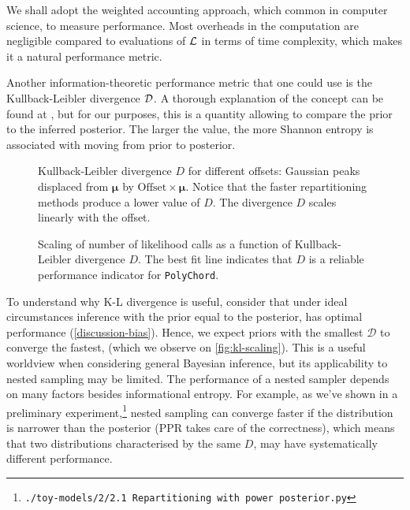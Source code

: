 \documentclass[usenatbib]{mnras}
\begin{document}
We shall adopt the weighted accounting approach, which common in
computer science, to measure performance. Most overheads in the
computation are negligible compared to evaluations of \({\cal L}\) in
terms of time complexity, which makes it a natural performance metric.



Another information-theoretic performance metric that one could use
is the Kullback-Leibler divergence \({\cal D}\). A thorough
explanation of the concept can be found at \cite{Kullback_1951}, but
for our purposes, this is a quantity allowing to compare the prior
to the inferred posterior. The larger the value, the more Shannon
entropy is associated with moving from prior to posterior. 

\begin{figure}
  
\caption{Kullback-Leibler divergence \(D\) for different offsets: Gaussian peaks displaced from \(\bm{\mu}\) by \(\text{Offset}\times \bm{\mu}\). Notice that the faster repartitioning methods produce a lower value of \(D\). The divergence \(D\) scales linearly with the offset. \label{fig:kl-d}}
\end{figure}

\begin{figure}
  
\caption{Scaling of number of likelihood calls as a function of Kullback-Leibler divergence \(D\). The best fit line indicates that \(D\) is a reliable performance indicator for \texttt{PolyChord}. \label{fig:kl-scaling}}
\end{figure}

To understand why K-L divergence is useful, consider that under
ideal circumstances inference with the prior equal to the
posterior, has optimal performance
(\autoref{discussion-bias}). Hence, we expect priors with the
smallest \(\mathcal{D}\) to converge the fastest, (which we observe
on \autoref{fig:kl-scaling}). This is a useful worldview when
considering general Bayesian inference, but its applicability to
nested sampling may be limited. The performance of a nested sampler
depends on many factors besides informational entropy. For example,
as we've shown in a preliminary experiment,\footnote{\texttt{./toy-models/2/2.1
   Repartitioning with power posterior.py}} nested sampling can
converge faster if the distribution is narrower than the posterior
(PPR takes care of the correctness), which means that two
distributions characterised by the same \(D\), may have
systematically different performance.
\end{document}
